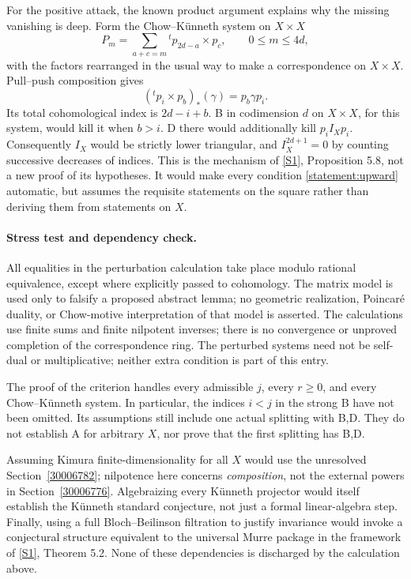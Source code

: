 \documentclass[11pt]{article}
\newcommand{\sref}[2]{\hyperlink{source:#1:#2}{[S#2]}}
\begin{document}
For the positive attack, the known product argument explains why the missing
vanishing is deep.  Form the Chow--K\"unneth system on $X\times X$
\[
 P_m=\sum_{a+c=m}{}^t p_{2d-a}\times p_c,
 \qquad 0\leq m\leq4d,
\]
with the factors rearranged in the usual way to make a correspondence on
$X\times X$.  Pull--push composition gives
\[
 ({}^t p_i\times p_b)_*(\gamma)=p_b\gamma p_i.
\]
Its total cohomological index is $2d-i+b$.  B in codimension $d$ on
$X\times X$, for this system, would kill it when $b>i$.  D there would
additionally kill $p_i I_X p_i$.  Consequently $I_X$ would be strictly
lower triangular, and $I_X^{2d+1}=0$ by counting successive decreases of
indices.  This is the mechanism of \sref{statement}{1}, Proposition 5.8, not a new
proof of its hypotheses.  It would make every condition
\eqref{statement:upward} automatic, but assumes the requisite statements on the
square rather than deriving them from statements on $X$.

\paragraph{Stress test and dependency check.}
All equalities in the perturbation calculation take place modulo rational
equivalence, except where explicitly passed to cohomology.  The matrix model
is used only to falsify a proposed abstract lemma; no geometric realization,
Poincar\'e duality, or Chow-motive interpretation of that model is asserted.
The calculations use finite sums and finite nilpotent inverses; there is no
convergence or unproved completion of the correspondence ring.  The perturbed
systems need not be self-dual or multiplicative; neither extra condition is
part of this entry.

The proof of the criterion handles every admissible $j$, every $r\geq0$,
and every Chow--K\"unneth system.  In particular, the indices $i<j$ in the
strong B have not been omitted.  Its assumptions still include one actual
splitting with B,D.  They do not establish A for arbitrary $X$, nor prove
that the first splitting has B,D.

Assuming Kimura finite-dimensionality for all $X$ would use the unresolved
Section~\ref{30006782}; nilpotence here concerns \emph{composition}, not the
external powers in Section~\ref{30006776}.  Algebraizing every K\"unneth projector
would itself establish the K\"unneth standard conjecture, not just a formal
linear-algebra step.  Finally, using a full Bloch--Beilinson filtration to
justify invariance would invoke a conjectural structure equivalent to the
universal Murre package in the framework of \sref{statement}{1}, Theorem 5.2.
None of these dependencies is discharged by the calculation above.
\end{document}
